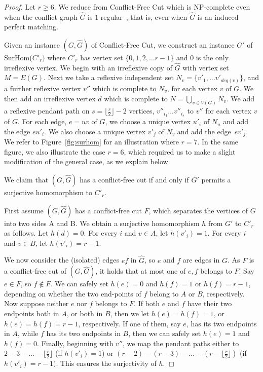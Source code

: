 \documentclass[a4paper,UKenglish,cleveref, autoref,thm-restate]{lipics-v2021}
\newcommand{\SurHom}{\ensuremath{\mathrm{SurHom}}}
\begin{document}
\begin{proof}
Let $r\geq 6$. We reduce from {\sc Conflict-Free Cut} which is NP-complete even when the conflict graph $\hat{G}$ is $1$-regular~\cite{RAUCH2025106503}, that is, even when $\hat{G}$ is an induced perfect matching. 

Given an instance $(G, \hat{G})$ of {\sc Conflict-Free Cut}, we construct an instance $G'$ of \SurHom($C'_r)$ where $C'_r$ has vertex set $\{0,1,2, \dots r-1 \}$ and $0$ is the only irreflexive vertex. We begin with an irreflexive copy of $\hat{G}$ with vertex set $M=E(G)$. Next we take a reflexive independent set $N_v= \{v'_1, \dots v'_{deg(v)}\}$, and a further reflexive vertex $v''$ which is complete to $N_v$, for each vertex $v$ of $G$. We then add an irreflexive vertex $d$ which is complete to $N=\bigcup_{v \in V(G)}N_v$. We add a reflexive pendant path on  $s=\lfloor \frac{r}{2} \rfloor-2$  vertices, $v''_{i_1} \dots v''_{i_s}$ to $v''$ for each vertex $v$ of $G$. For each edge, $e=uv$ of $G$, we choose a unique vertex $u'_i$ of $N_u$ and add the edge $eu'_i$.  We also choose a unique vertex $v'_j$ of $N_v$ and add the edge~$ev'_j$.
We refer to Figure~\ref{fig:surhom} for an illustration where $r=7$. In the same figure, we also illustrate the case $r=6$, which required us to make a slight modification of the general case, as we explain below.

We claim that $(G,\hat{G})$ has a conflict-free cut if and only if $G'$ permits a surjective homomorphism to $C'_r$.

First assume $(G, \hat{G})$ has a conflict-free cut $F$, which separates the vertices of $G$ into two sides A and B. We obtain a surjective homomorphism $h$ from $G'$ to $C'_r$ as follows. Let $h(d)=0$.
For every $i$ and $v\in A$, let $h(v'_i)=1$.
For every $i$ and $v\in B$, let $h(v'_i)=r-1$.

We now consider the (isolated) edges $ef$ in $\hat{G}$, so 
$e$ and $f$ are edges in $G$. 
As $F$ is a conflict-free cut of $(G,\hat{G})$, it holds that at most one of $e,f$ belongs to $F$.
Say $e\in F$, so $f\notin F$. We can safely set $h(e)=0$ and $h(f)=1$ or $h(f)=r-1$, depending on whether the two end-points of $f$ belong to $A$ or $B$, respectively.
Now suppose neither $e$ nor $f$ belongs to $F$.
If both $e$ and $f$ have their two endpoints both in $A$, or both in $B$, then we let
$h(e)=h(f)=1$, or $h(e)=h(f)=r-1$, respectively.
If one of them, say $e$, has its two endpoints in $A$, while $f$ has its two endpoints in $B$, then we can safely set $h(e)=1$ and $h(f)=0$.
Finally, beginning with $v''$, we map the pendant paths either to $2-3- \dots - \lfloor {\frac{r}{2}} \rfloor$ (if $h(v'_i)=1$) or $(r-2)-(r-3)- \dots -(r- \lfloor{\frac{r}{2} \rfloor})$ (if $h(v'_i)=r-1)$. This ensures the surjectivity of $h$. 


\end{proof}
\end{document}
